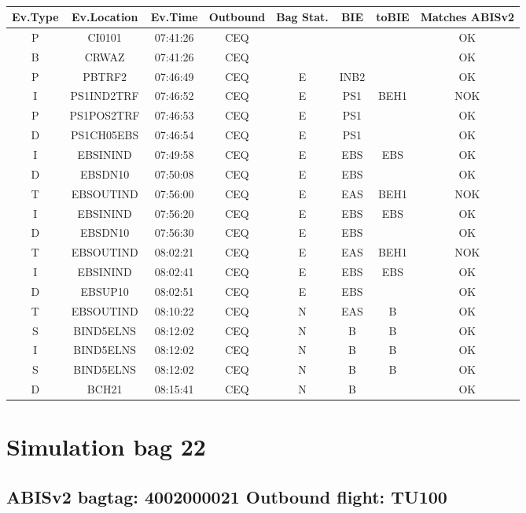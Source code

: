 \documentclass{report}
\begin{document}
\paragraph{}
\begin{longtable}{cccccccc}    \toprule
\rowcolor{white!50}
\textbf{Ev.Type} & \textbf{Ev.Location} & \textbf{Ev.Time} & \textbf{Outbound} & \textbf{Bag Stat.} & \textbf{BIE} & \textbf{toBIE} & \textbf{Matches ABISv2} \\\midrule
P & CI0101 & 07:41:26  & CEQ &  &  &  & OK\\
B & CRWAZ & 07:41:26  & CEQ &  &  &  & OK\\
P & PBTRF2 & 07:46:49  & CEQ & E & INB2 &  & OK\\
I & PS1IND2TRF & 07:46:52  & CEQ & E & PS1 & BEH1 & NOK\\
P & PS1POS2TRF & 07:46:53  & CEQ & E & PS1 &  & OK\\
D & PS1CH05EBS & 07:46:54  & CEQ & E & PS1 &  & OK\\
I & EBSININD & 07:49:58  & CEQ & E & EBS & EBS & OK\\
D & EBSDN10 & 07:50:08  & CEQ & E & EBS &  & OK\\
T & EBSOUTIND & 07:56:00  & CEQ & E & EAS & BEH1 & NOK\\
I & EBSININD & 07:56:20  & CEQ & E & EBS & EBS & OK\\
D & EBSDN10 & 07:56:30  & CEQ & E & EBS &  & OK\\
T & EBSOUTIND & 08:02:21  & CEQ & E & EAS & BEH1 & NOK\\
I & EBSININD & 08:02:41  & CEQ & E & EBS & EBS & OK\\
D & EBSUP10 & 08:02:51  & CEQ & E & EBS &  & OK\\
T & EBSOUTIND & 08:10:22  & CEQ & N & EAS & B & OK\\
S & BIND5ELNS & 08:12:02  & CEQ & N & B & B & OK\\
I & BIND5ELNS & 08:12:02  & CEQ & N & B & B & OK\\
S & BIND5ELNS & 08:12:02  & CEQ & N & B & B & OK\\
D & BCH21 & 08:15:41  & CEQ & N & B &  & OK\\
\bottomrule
\end{longtable}
\pagebreak
\section*{Simulation bag 22}
\subsection*{ABISv2 bagtag: 4002000021 Outbound flight: TU100}
\end{document}

